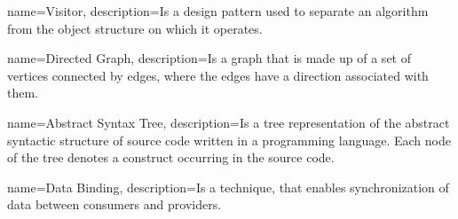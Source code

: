 

\makeglossaries

{
    name=Visitor,
    description={Is a design pattern used to separate an algorithm from the object structure on which it operates.}
}

{
    name=Directed Graph,
    description={Is a graph that is made up of a set of vertices connected by edges, where the edges have a direction associated with them.}
}


{
    name=Abstract Syntax Tree,
    description={Is a tree representation of the abstract syntactic structure of source code written in a programming language. Each node of the tree denotes a construct occurring in the source code.}
}


{
    name=Data Binding,
    description={Is a technique, that enables synchronization of data between consumers and providers.}
}











